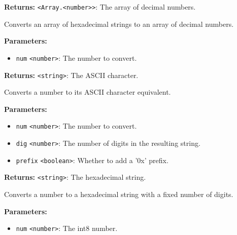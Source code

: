 \documentclass[12pt,a4paper]{article}
\begin{document}
\noindent \textbf{Returns:} \texttt{<Array.<number>>}: The array of decimal numbers.

\noindent Converts an array of hexadecimal strings to an array of decimal numbers.

\vspace{5mm}
\noindent {}


\noindent \textbf{Parameters:}
\begin{itemize}
  \item \texttt{num} \texttt{<number>}: The number to convert.
\end{itemize}

\noindent \textbf{Returns:} \texttt{<string>}: The ASCII character.

\noindent Converts a number to its ASCII character equivalent.

\vspace{5mm}
\noindent {}


\noindent \textbf{Parameters:}
\begin{itemize}
  \item \texttt{num} \texttt{<number>}: The number to convert.
  \item \texttt{dig} \texttt{<number>}: The number of digits in the resulting string.
  \item \texttt{prefix} \texttt{<boolean>}: Whether to add a '0x' prefix.
\end{itemize}

\noindent \textbf{Returns:} \texttt{<string>}: The hexadecimal string.

\noindent Converts a number to a hexadecimal string with a fixed number of digits.

\vspace{5mm}
\noindent {}


\noindent \textbf{Parameters:}
\begin{itemize}
  \item \texttt{num} \texttt{<number>}: The int8 number.
\end{itemize}
\end{document}
